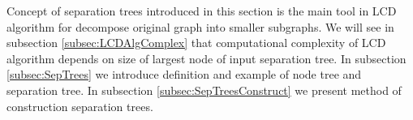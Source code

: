 %
%

Concept of separation trees introduced in this section is the main tool in LCD algorithm for
decompose original graph into smaller subgraphs. We will see in subsection \ref{subsec:LCDAlgComplex} that
computational complexity of LCD algorithm depends on size of largest node of input separation tree.
In subsection \ref{subsec:SepTrees} we introduce definition and example of node tree and separation tree.
In subsection \ref{subsec:SepTreesConstruct} we present method of construction separation trees.




